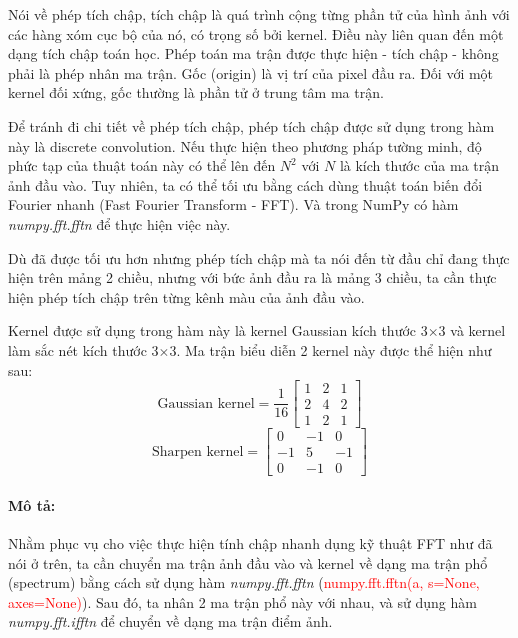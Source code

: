 \documentclass[]{article}
\begin{document}
Nói về phép tích chập, tích chập là quá trình cộng từng phần tử của hình ảnh với các hàng xóm cục bộ của nó, có trọng số bởi kernel. Điều này liên quan đến một dạng tích chập toán học. Phép toán ma trận được thực hiện - tích chập - không phải là phép nhân ma trận. Gốc (origin) là vị trí của pixel đầu ra. Đối với một kernel đối xứng, gốc thường là phần tử ở trung tâm ma trận. \par 

Để tránh đi chi tiết về phép tích chập, phép tích chập được sử dụng trong hàm này là discrete convolution. Nếu thực hiện theo phương pháp tường minh, độ phức tạp của thuật toán này có thể lên đến $N^2$ với $N$ là kích thước của ma trận ảnh đầu vào. Tuy nhiên, ta có thể tối ưu bằng cách dùng thuật toán biến đổi Fourier nhanh (Fast Fourier Transform - FFT). Và trong NumPy có hàm \textit{numpy.fft.fftn} để thực hiện việc này. \par

Dù đã được tối ưu hơn nhưng phép tích chập mà ta nói đến từ đầu chỉ đang thực hiện trên mảng 2 chiều, nhưng với bức ảnh đầu ra là mảng 3 chiều, ta cần thực hiện phép tích chập trên từng kênh màu của ảnh đầu vào. 

Kernel được sử dụng trong hàm này là kernel Gaussian kích thước 3$\times$3 và kernel làm sắc nét kích thước 3$\times$3. Ma trận biểu diễn 2 kernel này được thể hiện như sau:
\[ \text{Gaussian kernel} = \frac{1}{16} \begin{bmatrix} 1 & 2 & 1 \\ 2 & 4 & 2 \\ 1 & 2 & 1 \end{bmatrix} \]
\[ \text{Sharpen kernel} = \begin{bmatrix} 0 & -1 & 0 \\ -1 & 5 & -1 \\ 0 & -1 & 0 \end{bmatrix} \]
\paragraph{Mô tả:} 
Nhằm phục vụ cho việc thực hiện tính chập nhanh dụng kỹ thuật FFT như đã nói ở trên, ta cần chuyển ma trận ảnh đầu vào và kernel về dạng ma trận phổ (spectrum) bằng cách sử dụng hàm \textit{numpy.fft.fftn} (\textcolor{red}{numpy.fft.fftn(a, s=None, axes=None)}). Sau đó, ta nhân 2 ma trận phổ này với nhau, và sử dụng hàm \textit{numpy.fft.ifftn} để chuyển về dạng ma trận điểm ảnh. \par

\end{document}

